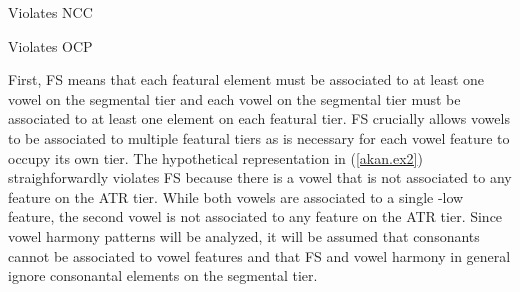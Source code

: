 \documentclass[,doc,floatsintext]{apa6}
\theoremstyle{definition}
\theoremstyle{definition}
\theoremstyle{definition}
\theoremstyle{remark}
\begin{document}
\begin{exe}
\ex \label{akan.ex3} Violates NCC
\end{exe}

\begin{exe}
\ex \label{akan.ex4} Violates OCP
\end{exe}

First, FS means that each featural element must be associated to at
least one vowel on the segmental tier and each vowel on the segmental
tier must be associated to at least one element on each featural tier.
FS crucially allows vowels to be associated to multiple featural tiers
as is necessary for each vowel feature to occupy its own tier. The
hypothetical representation in (\ref{akan.ex2}) straighforwardly
violates FS because there is a vowel that is not associated to any
feature on the ATR tier. While both vowels are associated to a single
-low feature, the second vowel is not associated to any feature on the
ATR tier. Since vowel harmony patterns will be analyzed, it will be
assumed that consonants cannot be associated to vowel features and that
FS and vowel harmony in general ignore consonantal elements on the
segmental tier.
\end{document}
